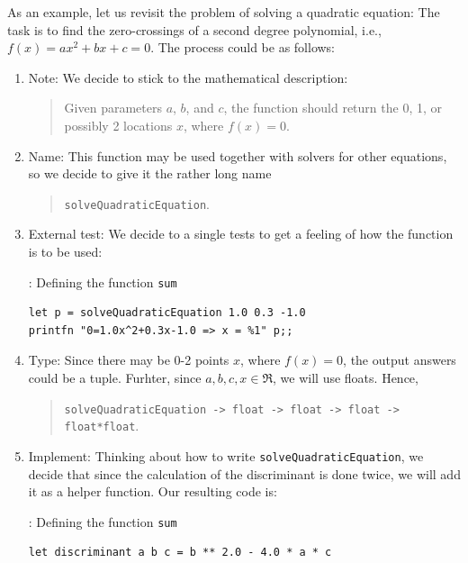 \documentclass[fsharpNotes.tex]{subfiles}
\begin{document}
As an example, let us revisit the problem of solving a quadratic equation: The task is to find the zero-crossings of a second degree polynomial, i.e., $f(x)=ax^2+bx+c=0$. The process could be as follows:
\begin{enumerate}
\item Note: We decide to stick to the mathematical description:
  \begin{quote}
    Given parameters $a$, $b$, and $c$, the function should return the 0, 1, or possibly 2 locations $x$, where $f(x)=0$.
  \end{quote}
\item Name: This function may be used together with solvers for other equations, so we decide to give it the rather long name
  \begin{quote}
    \lstinline{solveQuadraticEquation}.
  \end{quote}
\item External test: We decide to a single tests to get a feeling of how the function is to be used:
\begin{codeNOutput}[label=solveQuadraticEquationTest,
  top=-5pt,
  bottom=-5pt,
  left=-2pt,
  right=-2pt,
]{: Defining the function \lstinline{sum}}
\begin{lstlisting}
let p = solveQuadraticEquation 1.0 0.3 -1.0
printfn "0=1.0x^2+0.3x-1.0 => x = %1" p;;
\end{lstlisting} 
\end{codeNOutput}
\item Type: Since there may be 0-2 points $x$, where $f(x)=0$, the output answers could be a tuple. Furhter, since $a,b,c,x\in\Re$, we will use floats. Hence,
  \begin{quote}
    \lstinline{solveQuadraticEquation -> float -> float -> float -> float*float}.
  \end{quote}
\item Implement: Thinking about how to write  \lstinline{solveQuadraticEquation}, we decide that since the calculation of the discriminant is done twice, we will add it as a helper function. Our resulting code is:
\begin{codeNOutput}[label=solveQuadraticEquationImplementation,
  top=-5pt,
  bottom=-5pt,
  left=-2pt,
  right=-2pt,
]{: Defining the function \lstinline{sum}}
\begin{lstlisting}
let discriminant a b c = b ** 2.0 - 4.0 * a * c


\end{lstlisting}
\end{codeNOutput}
\end{enumerate}
\end{document}
